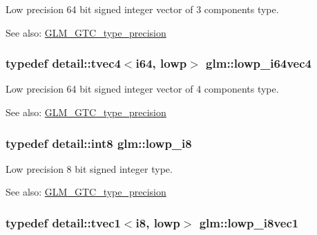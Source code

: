 Low precision 64 bit signed integer vector of 3 components type. \begin{Desc}
\item[See also:]\hyperlink{group__gtc__type__precision}{GLM\_\-GTC\_\-type\_\-precision} \end{Desc}
\hypertarget{group__gtc__type__precision_g95c13b9d4f94d1783e7d96534d1651d8}{
\subsubsection[lowp\_\-i64vec4]{\setlength{\rightskip}{0pt plus 5cm}typedef detail::tvec4$<$i64, lowp$>$ {\bf glm::lowp\_\-i64vec4}}}
\label{group__gtc__type__precision_g95c13b9d4f94d1783e7d96534d1651d8}


Low precision 64 bit signed integer vector of 4 components type. \begin{Desc}
\item[See also:]\hyperlink{group__gtc__type__precision}{GLM\_\-GTC\_\-type\_\-precision} \end{Desc}
\hypertarget{group__gtc__type__precision_ga2e13ee29c90f75658beed6082541097}{
\subsubsection[lowp\_\-i8]{\setlength{\rightskip}{0pt plus 5cm}typedef detail::int8 {\bf glm::lowp\_\-i8}}}
\label{group__gtc__type__precision_ga2e13ee29c90f75658beed6082541097}


Low precision 8 bit signed integer type. \begin{Desc}
\item[See also:]\hyperlink{group__gtc__type__precision}{GLM\_\-GTC\_\-type\_\-precision} \end{Desc}
\hypertarget{group__gtc__type__precision_g490ff77964d0386c1db936eb2a324988}{
\subsubsection[lowp\_\-i8vec1]{\setlength{\rightskip}{0pt plus 5cm}typedef detail::tvec1$<$i8, lowp$>$ {\bf glm::lowp\_\-i8vec1}}}
\label{group__gtc__type__precision_g490ff77964d0386c1db936eb2a324988}



